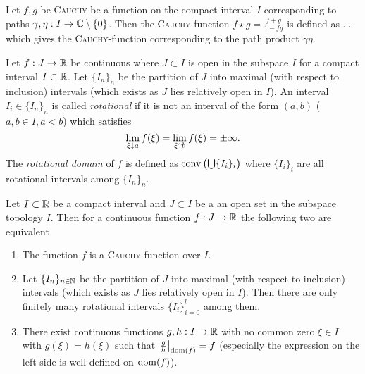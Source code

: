 \documentclass[10pt,a4paper]{article}
\begin{document}
\begin{definition}
Let $f,g$ be \textsc{Cauchy} be a function on the compact interval $I$ corresponding to paths $\gamma,\eta:I\rightarrow\mathbb{C}\setminus\{0\}$. Then the \textsc{Cauchy} function $f\star g=\frac{f+g}{1-fg}$ is defined as
...
which gives the \textsc{Cauchy}-function corresponding to the path product $\gamma\eta$.
\end{definition}




\begin{definition}
Let $f:J\rightarrow\mathbb{R}$ be continuous where $J\subset I$ is open in the subspace $I$ for a compact interval $I\subset\mathbb{R}$. Let $\{I_n\}_n$ be the partition of $J$ into maximal (with respect to inclusion) intervals (which exists as $J$ lies relatively open in $I$). An interval $I_i\in\{I_n\}_n$ is called \emph{rotational} if it is not an interval of the form $(a,b)$ ($a,b\in I, a<b$) which satisfies
\begin{equation}
\lim_{\xi\downarrow a}{f(\xi)}=\lim_{\xi\uparrow b}{f(\xi)}=\pm\infty\text{.}
\end{equation}
The \emph{rotational domain} of $f$ is defined as $\operatorname{conv}\left(\bigcup\{\bar{I}_i\}_i\right)$ where $\{\bar{I}_i\}_i$ are all rotational intervals among $\{I_n\}_n$.
\end{definition}


\begin{lemma}
Let $I\subset\mathbb{R}$ be a compact interval and $J\subset I$ be a an open set in the subspace topology $I$. Then for a continuous function $f:J\rightarrow\mathbb{R}$ the following two are equivalent
\begin{enumerate}
\item The function $f$ is a \textsc{Cauchy} function over $I$.
\item Let $\{I_n\}_{n\in\mathbb{N}}$ be the partition of $J$ into maximal (with respect to inclusion) intervals (which exists as $J$ lies relatively open in $I$). Then there are only finitely many rotational intervals $\{\bar{I}_i\}_{i=0}^l$ among them.
\item There exist continuous functions $g,h:I\rightarrow\mathbb{R}$ with no common zero $\xi\in I$ with $g(\xi)=h(\xi)$ such that $\left. \frac{g}{h}\right\vert_{\operatorname{dom}(f)}=f$ (especially the expression on the left side is well-defined on $\operatorname{dom}(f)$).
\end{enumerate}
\end{lemma}
\end{document}
